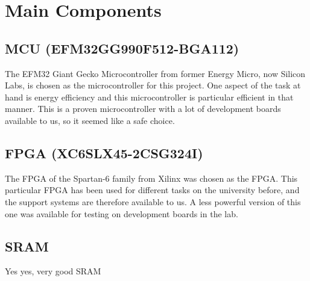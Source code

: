\documentclass[../main/report.tex]{subfiles}
\begin{document}
\section{Main Components}

\subsection*{MCU (EFM32GG990F512-BGA112)}
The EFM32 Giant Gecko Microcontroller from former Energy Micro, now Silicon Labs, is chosen as the microcontroller for this project.
One aspect of the task at hand is energy efficiency and this microcontroller is particular efficient in that manner.
This is a proven microcontroller with a lot of development boards available to us, so it seemed like a safe choice.

\subsection*{FPGA (XC6SLX45-2CSG324I)}
The FPGA of the Spartan-6 family from Xilinx was chosen as the FPGA.
This particular FPGA has been used for different tasks on the university before, and the support systems are therefore available to us.
A less powerful version of this one was available for testing on development boards in the lab.

\subsection*{SRAM}
Yes yes, very good SRAM 
\end{document}
